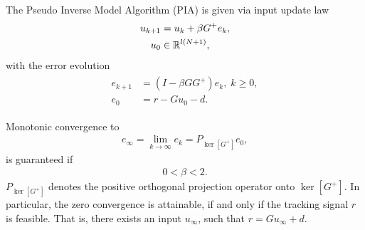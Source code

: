 \begin{alg}
	\label{alg:ILC:PIA}

	The Pseudo Inverse Model Algorithm (PIA) is given via input update law 
	\begin{align}
	\label{eq:ILD:errPIA}
	\begin{split}
	u_{k+1} &= u_k + \beta G^{+} e_k, \\
	u_0 & \in {\mathbb{R}}^{l (N+1)},
	\end{split}	
	\end{align}
	with  the error evolution
	\begin{align}
	\begin{split}
	e_{k+1} &= (I- \beta G G^+) e_{k}, \; k\geq 0, \\
	e_0 &= r -  Gu_0 -d.
	\end{split}
	\end{align}

	Monotonic convergence to 
	\begin{align}
	\label{eq:ILC:einfPIA} 
	e_\infty  = \lim_{k\to\infty} e_k = P_{\ker[G^+]}e_0,
	\end{align} 
	is guaranteed if
	\begin{align*}
	0 <\beta < 2.
	\end{align*}
	$P_{\ker[G^+]}$ denotes the positive orthogonal projection operator onto $\ker[G^+]$.
	In particular, the zero convergence is attainable, if and only if the tracking signal $r$ is feasible. That is, there exists an input $u_\infty$, such that $r = G u_\infty + d$. %
\end{alg}
